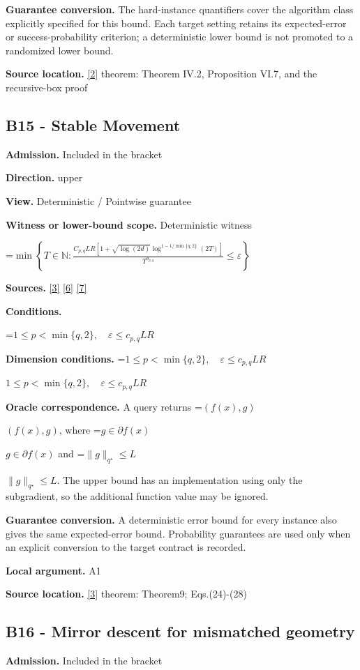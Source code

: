 \documentclass[10pt,a4paper]{article}
\newcommand{\AtlasMath}[1]{\par\begingroup\centering\setbox0=\hbox{$\displaystyle #1$}\ifdim\wd0>1.4\linewidth\typeout{ATLAS WIDE FORMULA: \the\wd0}\fi\ifdim\wd0>\linewidth\resizebox{\linewidth}{!}{\box0}\else\box0\fi\par\endgroup}
\newcommand{\AtlasInlineMath}[1]{\begingroup\setbox0=\hbox{$#1$}\ifdim\wd0>.4\linewidth\endgroup\AtlasMath{#1}\else\endgroup$#1$\fi}
\begin{document}
\textbf{Guarantee conversion.} The hard-instance quantifiers cover the algorithm class explicitly specified for this bound. Each target setting retains its expected-error or success-probability criterion; a deterministic lower bound is not promoted to a randomized lower bound.

\textbf{Source location.} \href{https://arxiv.org/pdf/1407.5144}{[2]} theorem: Theorem IV.2, Proposition VI.7, and the recursive-box proof

\subsection{B15 - Stable Movement}
\textbf{Admission.} Included in the bracket

\textbf{Direction.} upper

\textbf{View.} Deterministic / Pointwise guarantee

\textbf{Witness or lower-bound scope.} Deterministic witness

\AtlasMath{\min\left\{T\in\mathbb{N}:\frac{C_{p,q}LR[1+\sqrt{\log(2d)}\log^{1-1/\min\{q,2\}}(2T)]}{T^{\theta_{p,q}}}\le\varepsilon\right\}}
\textbf{Sources.} \href{https://arxiv.org/pdf/2609.20701}{[3]} \href{https://arxiv.org/pdf/1405.4980}{[6]} \href{https://www2.isye.gatech.edu/~nemirovs/MOR_AccuracyCertificates.pdf}{[7]}

\textbf{Conditions.} 
\AtlasMath{1\le p<\min\{q,2\},\quad\varepsilon\le c_{p,q}LR}


\textbf{Dimension conditions.} \AtlasInlineMath{1\le p<\min\{q,2\},\quad\varepsilon\le c_{p,q}LR}

\textbf{Oracle correspondence.} A query returns \AtlasInlineMath{(f(x),g)}, where \AtlasInlineMath{g\in\partial f(x)} and \AtlasInlineMath{\|g\|_{q^\star}\le L}. The upper bound has an implementation using only the subgradient, so the additional function value may be ignored.

\textbf{Guarantee conversion.} A deterministic error bound for every instance also gives the same expected-error bound. Probability guarantees are used only when an explicit conversion to the target contract is recorded.

\textbf{Local argument.} A1

\textbf{Source location.} \href{https://arxiv.org/pdf/2609.20701}{[3]} theorem: Theorem9; Eqs.(24)-(28)

\subsection{B16 - Mirror descent for mismatched geometry}
\textbf{Admission.} Included in the bracket
\end{document}
